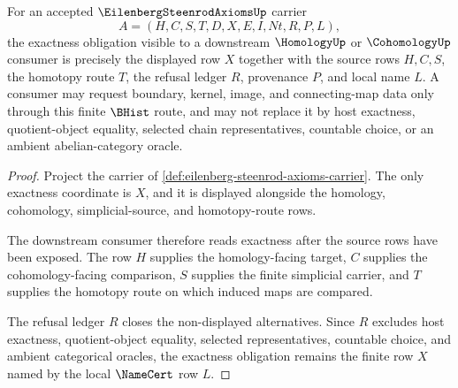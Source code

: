 \begin{theorem}
\label{thm:eilenberg-steenrod-exactness-obligation}
For an accepted $\EilenbergSteenrodAxiomsUp$ carrier
$$
A=(H,C,S,T,D,X,E,I,Nt,R,P,L),
$$
the exactness obligation visible to a downstream $\HomologyUp$ or $\CohomologyUp$ consumer is precisely the displayed row $X$ together with the source rows $H,C,S$, the homotopy route $T$, the refusal ledger $R$, provenance $P$, and local name $L$. A consumer may request boundary, kernel, image, and connecting-map data only through this finite $\BHist$ route, and may not replace it by host exactness, quotient-object equality, selected chain representatives, countable choice, or an ambient abelian-category oracle.
\end{theorem}
\begin{proof}
Project the carrier of \autoref{def:eilenberg-steenrod-axioms-carrier}. The only exactness coordinate is $X$, and it is displayed alongside the homology, cohomology, simplicial-source, and homotopy-route rows.

The downstream consumer therefore reads exactness after the source rows have been exposed. The row $H$ supplies the homology-facing target, $C$ supplies the cohomology-facing comparison, $S$ supplies the finite simplicial carrier, and $T$ supplies the homotopy route on which induced maps are compared.

The refusal ledger $R$ closes the non-displayed alternatives. Since $R$ excludes host exactness, quotient-object equality, selected representatives, countable choice, and ambient categorical oracles, the exactness obligation remains the finite row $X$ named by the local $\NameCert$ row $L$.
\end{proof}


